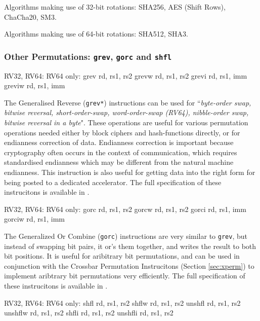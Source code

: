 Algorithms making use of 32-bit rotations:
SHA256, AES (Shift Rows), ChaCha20, SM3.

Algorithms making use of 64-bit rotations:
SHA512, SHA3.

\subsubsection{Other Permutations: {\tt grev}, {\tt gorc} and {\tt shfl}}
\label{sec:scalar:bitmanip:grev}

\begin{cryptobitmanipisa}
RV32, RV64:                         RV64 only:
    grev rd, rs1, rs2                   grevw rd, rs1, rs2
    grevi rd, rs1, imm                  greviw rd, rs1, imm
\end{cryptobitmanipisa}

The Generalised Reverse ({\tt grev*}) instructions can be used for 
``{\em byte-order swap, bitwise reversal, short-order-swap,
word-order-swap (RV64), nibble-order swap, bitwise reversal in a byte}".
These operations are useful for various permutation operations
needed either by block ciphers and hash-functions directly, or for
endianness correction of data.
Endianness correction is important because
cryptography often occurs in the context of communication, which requires
standardised endianness which may be different from the natural machine
endianness.
This instruction is also useful for getting data into the right form
for being posted to a dedicated accelerator.
The full specification of these instrucitons is available in
\cite[Section 2.2.2]{riscv:bitmanip:draft}.

\begin{cryptobitmanipisa}
RV32, RV64:                         RV64 only:
    gorc    rd, rs1, rs2                gorcw   rd, rs1, rs2
    gorci   rd, rs1, imm                gorciw  rd, rs1, imm
\end{cryptobitmanipisa}

The Generalized Or Combine ({\tt gorc}) instructions are very similar
to {\tt grev}, but instead of swapping bit pairs, it or's them together,
and writes the result to both bit positions.
It is useful for aribitrary bit permutations, and can be used in
conjunction with the Crossbar Permutation Instrucitons
(Section \ref{sec:xperm}) to implement aribtrary bit permutations
very efficiently.
The full specification of these instrucitons is available in
\cite[Section 2.3]{riscv:bitmanip:draft}.

\begin{cryptobitmanipisa}
RV32, RV64:                         RV64 only:
    shfl    rd, rs1, rs2                shflw   rd, rs1, rs2
    unshfl  rd, rs1, rs2                unshflw rd, rs1, rs2
    shfli   rd, rs1, rs2
    unshfli rd, rs1, rs2
\end{cryptobitmanipisa}

